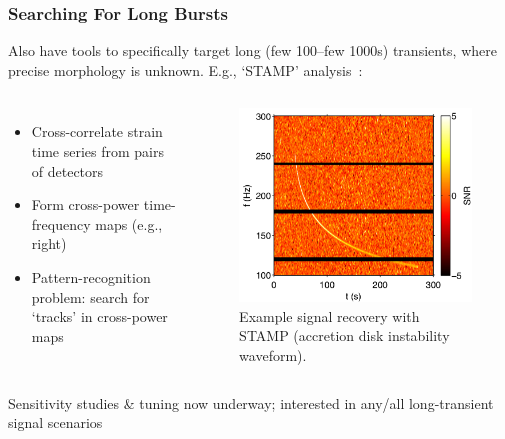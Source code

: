\documentclass[serif,mathserif,10pt]{beamer}
\let\oldframetitle\frametitle%
\renewcommand{\frametitle}[1]{%
      \oldframetitle{#1}\setstretch{1.2}}
\begin{document}
\begin{frame}
    \frametitle{Searching For Long Bursts}
%
    Also have tools to specifically target long (few 100--few 1000s)
    transients, where precise morphology is unknown.  E.g., `STAMP'
    analysis~\cite{2011PhRvD..83h3004T}:

    \begin{columns}

        \begin{itemize}
            \item Cross-correlate strain time series from pairs of detectors
            \item Form cross-power time-frequency maps (e.g., right)
            \item Pattern-recognition problem: search for `tracks' in
                cross-power maps
        \end{itemize}

        \begin{center}
            \vspace{-0.1cm}
            \begin{figure}
                \includegraphics[width=0.8\columnwidth]{figures/stampadi.png}
                \caption{Example signal recovery with STAMP (accretion disk
                instability waveform).}  %
            \end{figure}
        \end{center}

    \end{columns}

    Sensitivity studies \& tuning now underway; interested in any/all
    long-transient signal scenarios

\end{frame}
\end{document}

